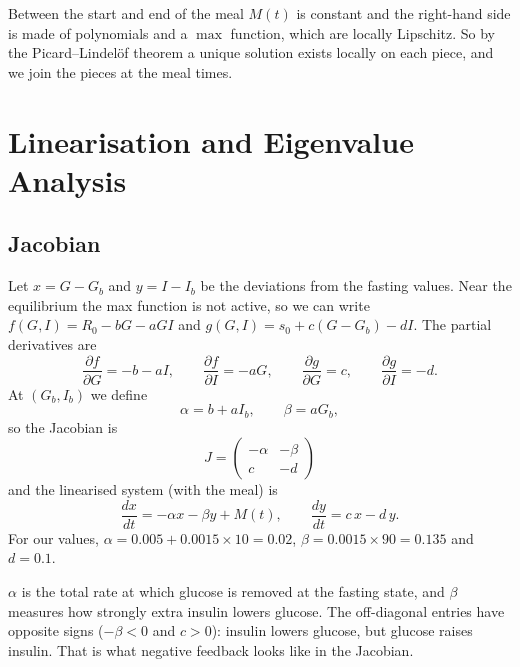 \documentclass[11pt,a4paper]{article}
\newcommand{\Gb}{G_b}
\newcommand{\Ib}{I_b}
\begin{document}
Between the start and end of the meal $M(t)$ is constant and the right-hand side is made of polynomials and a $\max$ function, which are locally Lipschitz. So by the Picard--Lindel\"of theorem \cite{boyce} a unique solution exists locally on each piece, and we join the pieces at the meal times.


\section{Linearisation and Eigenvalue Analysis}\label{sec:linear}

\subsection{Jacobian}
Let $x=G-\Gb$ and $y=I-\Ib$ be the deviations from the fasting values. Near the equilibrium the max function is not active, so we can write $f(G,I)=R_0-bG-aGI$ and $g(G,I)=s_0+c(G-\Gb)-dI$. The partial derivatives are
\[
\frac{\partial f}{\partial G}=-b-aI,\qquad
\frac{\partial f}{\partial I}=-aG,\qquad
\frac{\partial g}{\partial G}=c,\qquad
\frac{\partial g}{\partial I}=-d .
\]
At $(\Gb,\Ib)$ we define
\begin{equation}\label{eq:alphabeta}
\alpha = b + a\Ib, \qquad \beta = a\Gb,
\end{equation}
so the Jacobian is
\begin{equation}\label{eq:J}
J=\begin{pmatrix} -\alpha & -\beta \\ c & -d \end{pmatrix}
\end{equation}
and the linearised system (with the meal) is
\begin{equation}\label{eq:linear}
\frac{dx}{dt} = -\alpha x - \beta y + M(t),\qquad \frac{dy}{dt} = c\,x - d\,y .
\end{equation}
For our values, $\alpha=0.005+0.0015\times10=0.02$, $\beta=0.0015\times90=0.135$ and $d=0.1$.

$\alpha$ is the total rate at which glucose is removed at the fasting state, and $\beta$ measures how strongly extra insulin lowers glucose. The off-diagonal entries have opposite signs ($-\beta<0$ and $c>0$): insulin lowers glucose, but glucose raises insulin. That is what negative feedback looks like in the Jacobian.
\end{document}
